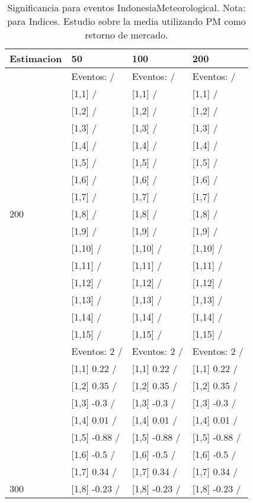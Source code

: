 \begin{table}

\caption{Significancia para eventos IndonesiaMeteorological. Nota: para Indices. Estudio sobre la media utilizando PM como retorno de mercado.}
\centering
\begin{tabular}[t]{llll}
\toprule
Estimacion & 50 & 100 & 200\\
\midrule
 & Eventos:   / & Eventos:   / & Eventos:   /\\
 & {}[1,1]  / & {}[1,1]  / & {}[1,1]  /\\
 & {}[1,2]  / & {}[1,2]  / & {}[1,2]  /\\
 & {}[1,3]  / & {}[1,3]  / & {}[1,3]  /\\
 & {}[1,4]  / & {}[1,4]  / & {}[1,4]  /\\
\addlinespace
 & {}[1,5]  / & {}[1,5]  / & {}[1,5]  /\\
 & {}[1,6]  / & {}[1,6]  / & {}[1,6]  /\\
 & {}[1,7]  / & {}[1,7]  / & {}[1,7]  /\\
200 & {}[1,8]  / & {}[1,8]  / & {}[1,8]  /\\
 & {}[1,9]  / & {}[1,9]  / & {}[1,9]  /\\
\addlinespace
 & {}[1,10]  / & {}[1,10]  / & {}[1,10]  /\\
 & {}[1,11]  / & {}[1,11]  / & {}[1,11]  /\\
 & {}[1,12]  / & {}[1,12]  / & {}[1,12]  /\\
 & {}[1,13]  / & {}[1,13]  / & {}[1,13]  /\\
 & {}[1,14]  / & {}[1,14]  / & {}[1,14]  /\\
\addlinespace
 & {}[1,15]  / & {}[1,15]  / & {}[1,15]  /\\
 & Eventos:  2 / & Eventos:  2 / & Eventos:  2 /\\
 & {}[1,1] 0.22  / & {}[1,1] 0.22  / & {}[1,1] 0.22  /\\
 & {}[1,2] 0.35  / & {}[1,2] 0.35  / & {}[1,2] 0.35  /\\
 & {}[1,3] -0.3  / & {}[1,3] -0.3  / & {}[1,3] -0.3  /\\
\addlinespace
 & {}[1,4] 0.01  / & {}[1,4] 0.01  / & {}[1,4] 0.01  /\\
 & {}[1,5] -0.88  / & {}[1,5] -0.88  / & {}[1,5] -0.88  /\\
 & {}[1,6] -0.5  / & {}[1,6] -0.5  / & {}[1,6] -0.5  /\\
 & {}[1,7] 0.34  / & {}[1,7] 0.34  / & {}[1,7] 0.34  /\\
300 & {}[1,8] -0.23  / & {}[1,8] -0.23  / & {}[1,8] -0.23  /\\

\end{tabular}
\end{table}
